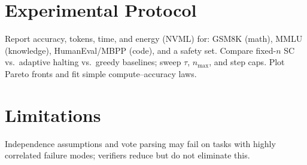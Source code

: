 \section{Experimental Protocol}
Report accuracy, tokens, time, and energy (NVML) for: GSM8K (math), MMLU (knowledge), HumanEval/MBPP (code), and a safety set. Compare fixed-$n$ SC vs.\ adaptive halting vs.\ greedy baselines; sweep $\tau$, $n_{\max}$, and step caps. Plot Pareto fronts and fit simple compute–accuracy laws.

\section{Limitations}
Independence assumptions and vote parsing may fail on tasks with highly correlated failure modes; verifiers reduce but do not eliminate this.
